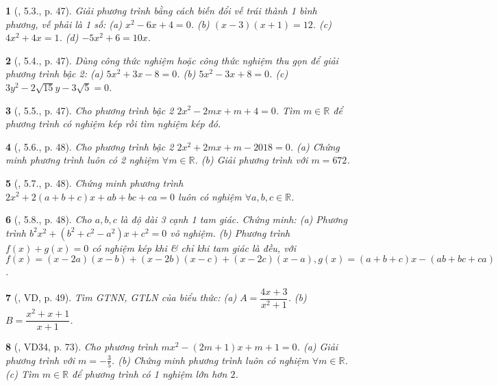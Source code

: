 \documentclass{article}
\newtheorem{baitoan}{}
\begin{document}
\begin{baitoan}[\cite{Binh_boi_duong_Toan_9_tap_2}, 5.3., p. 47]
	Giải phương trình bằng cách biến đổi vế trái thành 1 bình phương, vế phải là 1 số: (a) $x^2 - 6x + 4 = 0$. (b) $(x - 3)(x + 1) = 12$. (c) $4x^2 + 4x = 1$. (d) $-5x^2 + 6 = 10x$.
\end{baitoan}

\begin{baitoan}[\cite{Binh_boi_duong_Toan_9_tap_2}, 5.4., p. 47]
	Dùng công thức nghiệm hoặc công thức nghiệm thu gọn để giải phương trình bậc 2: (a) $5x^2 + 3x - 8 = 0$. (b) $5x^2 - 3x + 8 = 0$. (c) $3y^2 - 2\sqrt{15}y - 3\sqrt{5} = 0$.
\end{baitoan}

\begin{baitoan}[\cite{Binh_boi_duong_Toan_9_tap_2}, 5.5., p. 47]
	Cho phương trình bậc 2 $2x^2 - 2mx + m + 4 = 0$. Tìm $m\in\mathbb{R}$ để phương trình có nghiệm kép rồi tìm nghiệm kép đó.
\end{baitoan}

\begin{baitoan}[\cite{Binh_boi_duong_Toan_9_tap_2}, 5.6., p. 48]
	Cho phương trình bậc 2 $2x^2 + 2mx + m - 2018 = 0$. (a) Chứng minh phương trình luôn có 2 nghiệm $\forall m\in\mathbb{R}$. (b) Giải phương trình với $m = 672$.
\end{baitoan}

\begin{baitoan}[\cite{Binh_boi_duong_Toan_9_tap_2}, 5.7., p. 48]
	Chứng minh phương trình $2x^2 + 2(a + b + c)x + ab + bc + ca = 0$ luôn có nghiệm $\forall a,b,c\in\mathbb{R}$.
\end{baitoan}

\begin{baitoan}[\cite{Binh_boi_duong_Toan_9_tap_2}, 5.8., p. 48]
	Cho $a,b,c$ là độ dài 3 cạnh 1 tam giác. Chứng minh: (a) Phương trình $b^2x^2 + (b^2 + c^2 - a^2)x + c^2 = 0$ vô nghiệm. (b) Phương trình $f(x) + g(x) = 0$ có nghiệm kép khi \& chỉ khi tam giác là đều, với $f(x) = (x - 2a)(x - b) + (x - 2b)(x - c) + (x - 2c)(x - a),g(x) = (a + b + c)x - (ab + bc + ca)$.
\end{baitoan}

\begin{baitoan}[\cite{Binh_boi_duong_Toan_9_tap_2}, VD, p. 49]
	Tìm {\rm GTNN, GTLN} của biểu thức: (a) $A = \dfrac{4x + 3}{x^2 + 1}$. (b) $B = \dfrac{x^2 + x + 1}{x + 1}$.
\end{baitoan}

\begin{baitoan}[\cite{Tuyen_Toan_9_old}, VD34, p. 73]
	Cho phương trình $mx^2 - (2m + 1)x + m + 1 = 0$. (a) Giải phương trình với $m = -\frac{3}{5}$. (b) Chứng minh phương trình luôn có nghiệm $\forall m\in\mathbb{R}$. (c) Tìm $m\in\mathbb{R}$ để phương trình có 1 nghiệm lớn hơn $2$.
\end{baitoan}
\end{document}
